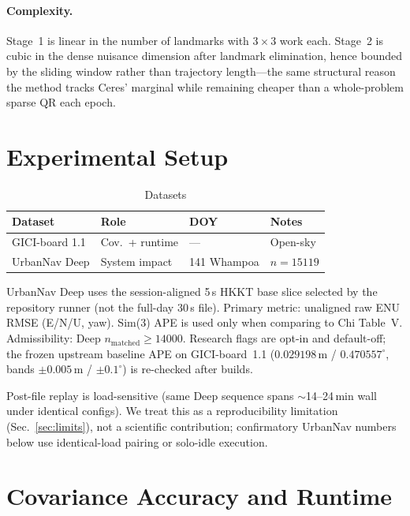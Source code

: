 \documentclass[letterpaper, journal, twocolumn]{IEEEtran}
\begin{document}
\paragraph{Complexity.}
Stage~1 is linear in the number of landmarks with $3\times3$ work each.
Stage~2 is cubic in the dense nuisance dimension after landmark elimination,
hence bounded by the sliding window rather than trajectory length---the same
structural reason the method tracks Ceres' marginal while remaining cheaper
than a whole-problem sparse QR each epoch.

\section{Experimental Setup}
\label{sec:setup}

\begin{table}[!t]
\caption{Datasets}
\label{tab:datasets}
\centering
\scriptsize
\begin{tabular}{@{}p{}p{}p{}p{}@{}}
\toprule
Dataset & Role & DOY & Notes \\
\midrule
GICI-board 1.1 & Cov.\ + runtime & --- & Open-sky \\
UrbanNav Deep & System impact & 141 Whampoa & $n{=}15119$ \\
\bottomrule
\end{tabular}
\end{table}

UrbanNav Deep uses the session-aligned 5\,s HKKT base slice selected by the
repository runner (not the full-day 30\,s file).
Primary metric: unaligned raw ENU RMSE (E/N/U, yaw).
Sim(3) APE is used only when comparing to Chi Table~V.
Admissibility: Deep $n_{\mathrm{matched}}\ge14000$.
Research flags are opt-in and default-off; the frozen upstream baseline APE on
GICI-board~1.1 ($0.029198$\,m / $0.470557^\circ$, bands $\pm0.005$\,m /
$\pm0.1^\circ$) is re-checked after builds.

Post-file replay is load-sensitive (same Deep sequence spans $\sim$14--24\,min
wall under identical configs).
We treat this as a reproducibility limitation (Sec.~\ref{sec:limits}), not a
scientific contribution; confirmatory UrbanNav numbers below use
identical-load pairing or solo-idle execution.

\section{Covariance Accuracy and Runtime}
\label{sec:covres}
\end{document}
